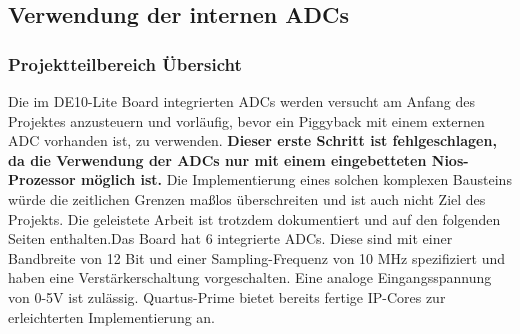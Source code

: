 \subsection{Verwendung der internen ADCs}
\subsubsection{Projektteilbereich Übersicht}
Die im DE10-Lite Board integrierten ADCs werden versucht am Anfang des Projektes anzusteuern und vorläufig, bevor ein Piggyback mit einem externen ADC vorhanden ist, zu verwenden. \textbf{Dieser erste Schritt ist fehlgeschlagen, da die Verwendung der ADCs nur mit einem eingebetteten Nios-Prozessor möglich ist.} Die Implementierung eines solchen komplexen Bausteins würde die zeitlichen Grenzen maßlos überschreiten und ist auch nicht Ziel des Projekts. Die geleistete Arbeit ist trotzdem dokumentiert und auf den folgenden Seiten enthalten.\newline Das Board hat 6 integrierte ADCs. Diese sind mit einer Bandbreite von 12 Bit und einer Sampling-Frequenz von 10 MHz spezifiziert und haben eine Verstärkerschaltung vorgeschalten. Eine analoge Eingangsspannung von 0-5V ist zulässig. Quartus-Prime bietet bereits fertige IP-Cores zur erleichterten Implementierung an.
 
